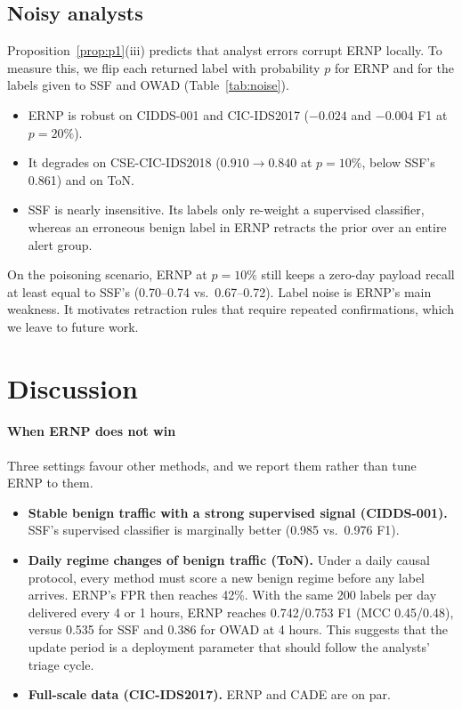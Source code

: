 \documentclass[preprint,12pt]{elsarticle}
\begin{document}
\subsection{Noisy analysts}\label{sec:noise}
Proposition~\ref{prop:p1}(iii) predicts that analyst errors corrupt ERNP locally. To measure this, we flip each returned label with probability $p$ for ERNP and for the labels given to SSF and OWAD (Table~\ref{tab:noise}).
\begin{itemize}
\item ERNP is robust on CIDDS-001 and CIC-IDS2017 ($-0.024$ and $-0.004$ F1 at $p=20\%$).
\item It degrades on CSE-CIC-IDS2018 ($0.910\rightarrow0.840$ at $p=10\%$, below SSF's 0.861) and on ToN.
\item SSF is nearly insensitive. Its labels only re-weight a supervised classifier, whereas an erroneous benign label in ERNP retracts the prior over an entire alert group.
\end{itemize}
On the poisoning scenario, ERNP at $p=10\%$ still keeps a zero-day payload recall at least equal to SSF's (0.70--0.74 vs.\ 0.67--0.72). Label noise is ERNP's main weakness. It motivates retraction rules that require repeated confirmations, which we leave to future work.

\begin{table}[t]
\centering\small
\caption{Noisy analyst: F1 when each label is flipped with probability $p$ (seeds 0--2).}\label{tab:noise}

\end{table}

\section{Discussion}\label{sec:discussion}
\paragraph{When ERNP does not win}
Three settings favour other methods, and we report them rather than tune ERNP to them.
\begin{itemize}
\item \textbf{Stable benign traffic with a strong supervised signal (CIDDS-001).} SSF's supervised classifier is marginally better (0.985 vs.\ 0.976 F1).
\item \textbf{Daily regime changes of benign traffic (ToN).} Under a daily causal protocol, every method must score a new benign regime before any label arrives. ERNP's FPR then reaches 42\%. With the same 200 labels per day delivered every 4 or 1 hours, ERNP reaches 0.742/0.753 F1 (MCC 0.45/0.48), versus 0.535 for SSF and 0.386 for OWAD at 4 hours. This suggests that the update period is a deployment parameter that should follow the analysts' triage cycle.
\item \textbf{Full-scale data (CIC-IDS2017).} ERNP and CADE are on par.
\end{itemize}
\end{document}

